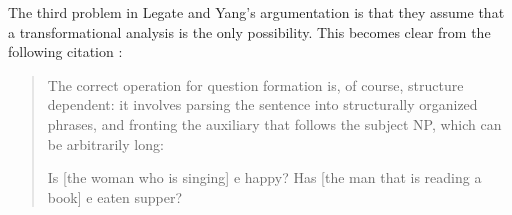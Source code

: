 The third problem in Legate and Yang's argumentation is that they assume that a transformational analysis is the only possibility. This becomes clear
from the following citation \citep[]{LY2002a}:
\begin{quote}
The correct operation for question formation is, of course, structure dependent: it involves parsing
the sentence into structurally organized phrases, and fronting the auxiliary that follows the
subject NP, which can be arbitrarily long:
\begin{exe}
\begin{xlist}
\ex Is [the woman who is singing] e happy?
\ex Has [the man that is reading a book] e eaten supper?
\end{xlist}
\end{exe}
\end{quote}

